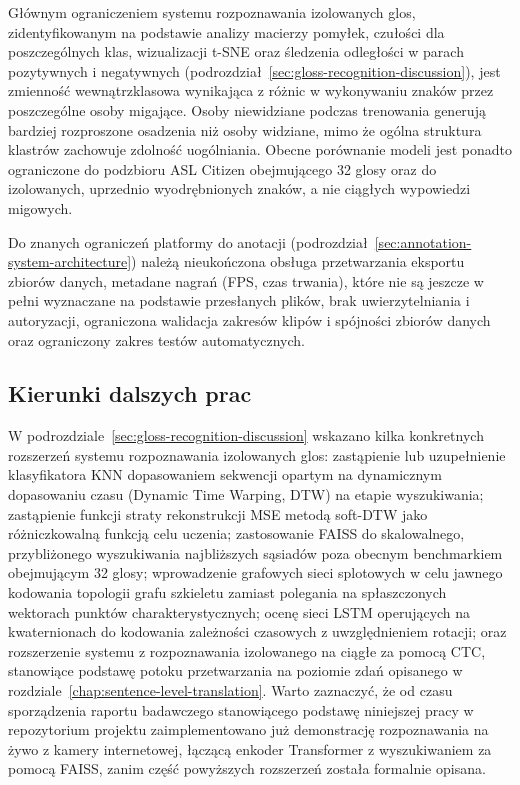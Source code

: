 Głównym ograniczeniem systemu rozpoznawania izolowanych glos, zidentyfikowanym
na podstawie analizy macierzy pomyłek, czułości dla poszczególnych klas,
wizualizacji t-SNE oraz śledzenia odległości w parach pozytywnych i negatywnych
(podrozdział~\ref{sec:gloss-recognition-discussion}), jest zmienność
wewnątrzklasowa wynikająca z różnic w wykonywaniu znaków przez poszczególne osoby
migające. Osoby niewidziane podczas trenowania generują bardziej rozproszone
osadzenia niż osoby widziane, mimo że ogólna struktura klastrów zachowuje zdolność
uogólniania. Obecne porównanie modeli jest ponadto ograniczone do podzbioru
ASL Citizen obejmującego 32 glosy oraz do izolowanych, uprzednio wyodrębnionych
znaków, a nie ciągłych wypowiedzi migowych.

Do znanych ograniczeń platformy do anotacji
(podrozdział~\ref{sec:annotation-system-architecture}) należą nieukończona obsługa
przetwarzania eksportu zbiorów danych, metadane nagrań (FPS, czas trwania), które
nie są jeszcze w pełni wyznaczane na podstawie przesłanych plików, brak
uwierzytelniania i autoryzacji, ograniczona walidacja zakresów klipów i spójności
zbiorów danych oraz ograniczony zakres testów automatycznych.


\subsection{Kierunki dalszych prac}
\label{sec:conclusions-future-work}

W podrozdziale~\ref{sec:gloss-recognition-discussion} wskazano kilka konkretnych
rozszerzeń systemu rozpoznawania izolowanych glos: zastąpienie lub uzupełnienie
klasyfikatora KNN dopasowaniem sekwencji opartym na dynamicznym dopasowaniu czasu
(Dynamic Time Warping, DTW) na etapie wyszukiwania; zastąpienie funkcji straty
rekonstrukcji MSE metodą soft-DTW jako różniczkowalną funkcją celu uczenia;
zastosowanie FAISS do skalowalnego, przybliżonego wyszukiwania najbliższych
sąsiadów poza obecnym benchmarkiem obejmującym 32 glosy; wprowadzenie grafowych
sieci splotowych w celu jawnego kodowania topologii grafu szkieletu zamiast
polegania na spłaszczonych wektorach punktów charakterystycznych; ocenę sieci
LSTM operujących na kwaternionach do kodowania zależności czasowych
z uwzględnieniem rotacji; oraz rozszerzenie systemu z rozpoznawania izolowanego
na ciągłe za pomocą CTC, stanowiące podstawę potoku przetwarzania na poziomie
zdań opisanego w rozdziale~\ref{chap:sentence-level-translation}. Warto zaznaczyć,
że od czasu sporządzenia raportu badawczego stanowiącego podstawę niniejszej pracy
w repozytorium projektu zaimplementowano już demonstrację rozpoznawania na żywo
z kamery internetowej, łączącą enkoder Transformer z wyszukiwaniem za pomocą
FAISS, zanim część powyższych rozszerzeń została formalnie opisana.

